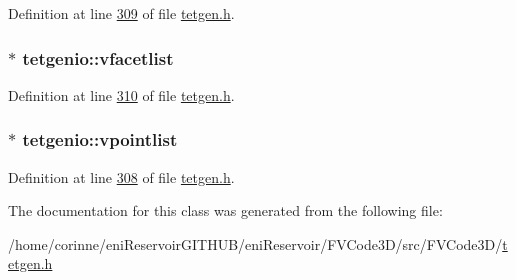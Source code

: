 Definition at line \hyperlink{tetgen_8h_source_l00309}{309} of file \hyperlink{tetgen_8h_source}{tetgen.\+h}.

\subsubsection[{\texorpdfstring{vfacetlist}{vfacetlist}}]{$\ast$ tetgenio\+::vfacetlist}\hypertarget{classtetgenio_a14c253eb433eecf874ab4b6fba68c683}{}\label{classtetgenio_a14c253eb433eecf874ab4b6fba68c683}


Definition at line \hyperlink{tetgen_8h_source_l00310}{310} of file \hyperlink{tetgen_8h_source}{tetgen.\+h}.

\subsubsection[{\texorpdfstring{vpointlist}{vpointlist}}]{$\ast$ tetgenio\+::vpointlist}\hypertarget{classtetgenio_afecb51e1302b9006eba50bc2a995b372}{}\label{classtetgenio_afecb51e1302b9006eba50bc2a995b372}


Definition at line \hyperlink{tetgen_8h_source_l00308}{308} of file \hyperlink{tetgen_8h_source}{tetgen.\+h}.



The documentation for this class was generated from the following file\+:\begin{DoxyCompactItemize}
\item 
/home/corinne/eni\+Reservoir\+G\+I\+T\+H\+U\+B/eni\+Reservoir/\+F\+V\+Code3\+D/src/\+F\+V\+Code3\+D/\hyperlink{tetgen_8h}{tetgen.\+h}\end{DoxyCompactItemize}
